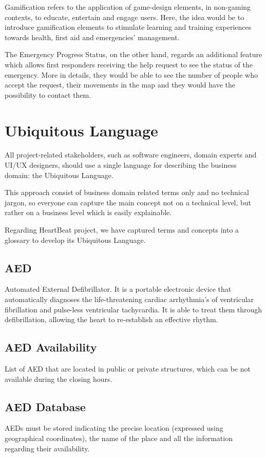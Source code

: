 \documentclass[11pt,a4paper]{article}
\begin{document}
Gamification refers to the application of game-design elements, in non-gaming contexts, to educate, entertain and engage users.
%
Here, the idea would be to introduce gamification elements to stimulate learning and training experiences towards health, first aid and emergencies' management.

The Emergency Progress Status, on the other hand, regards an additional feature which allows first responders receiving the help request to see the status of the emergency.
%
More in details, they would be able to see the number of people who accept the request, their movements in the map and they would have the possibility to contact them.

\section{Ubiquitous Language}

All project-related stakeholders, such as software engineers, domain experts and UI/UX designers, should use a single language for describing the business domain: the Ubiquitous Language. 

This approach consist of business domain related terms only and no technical jargon, so everyone can capture the main concept not on a technical level, but rather on a business level which is easily explainable. 

Regarding HeartBeat project, we have captured terms and concepts into a glossary to develop its Ubiquitous Language.

\subsection*{AED}
Automated External Defibrillator.
%
It is a portable electronic device that automatically diagnoses the life-threatening cardiac arrhythmia's of ventricular fibrillation and pulse-less ventricular tachycardia.
%
It is able to treat them through defibrillation, allowing the heart to re-establish an effective rhythm.

\subsection*{AED Availability}
List of AED that are located in public or private structures, which can be not available during the closing hours.

\subsection*{AED Database}
AEDs must be stored indicating the precise location (expressed using geographical coordinates), the name of the place and all the information regarding their availability.
\end{document}
